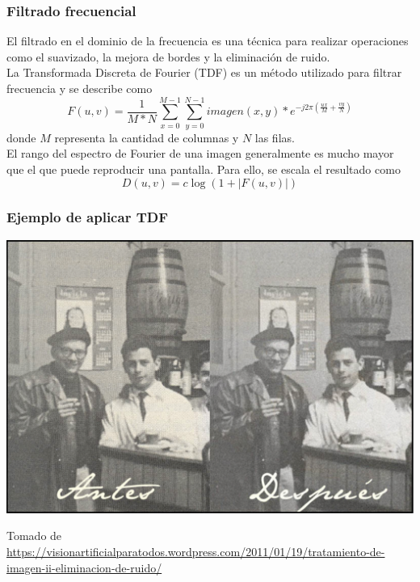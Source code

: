 \documentclass[
10pt, %
aspectratio=169, %
]{beamer}
\begin{document}
	\begin{frame}
		
		\frametitle{Filtrado frecuencial}
		
		El filtrado en el dominio de la frecuencia es una técnica para realizar operaciones como el suavizado, la mejora de bordes y la eliminación de ruido. \\[2mm]
		
		\pause
		La Transformada Discreta de Fourier (TDF) es un método utilizado para filtrar frecuencia y se describe como
		$$F(u, v) = \frac{1}{M*N} \sum_{x=0}^{M-1} \sum_{y=0}^{N-1} imagen(x,y) * e^{-j2\pi(\frac{ux}{M} + \frac{vy}{N})}$$
		donde $M$ representa la cantidad de columnas y $N$ las filas. \\[2mm]
		
		\pause
		El rango del espectro de Fourier de una imagen generalmente es mucho mayor que el que puede reproducir una pantalla. Para ello, se escala el resultado como 
		$$D(u,v)=c\log(1+|F(u,v)|)$$
		
	\end{frame}
	
	\begin{frame}
		
		\frametitle{Ejemplo de aplicar TDF}
		
		\centering
		\includegraphics[scale=0.38]{tdf.png} 
		
		{\scriptsize Tomado de \url{https://visionartificialparatodos.wordpress.com/2011/01/19/tratamiento-de-imagen-ii-eliminacion-de-ruido/}}
		
	\end{frame}
	
\end{document}
